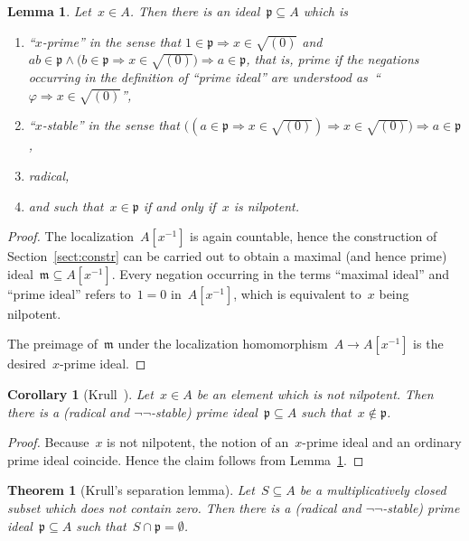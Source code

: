 \documentclass[com,11pt,crcready]{iosart2x}
\theoremstyle{definition}
\theoremstyle{plain}
\newtheorem{corollary}[definition]{Corollary}
\newtheorem{lemma}[definition]{Lemma}
\newtheorem{theorem}[definition]{Theorem}
\theoremstyle{remark}
\newcommand{\mmm}{\mathfrak{m}}
\newcommand{\ppp}{\mathfrak{p}}
\renewcommand{\_}{\mathpunct{.}\,}
\begin{document}
\begin{lemma}\label{lemma:x-prime}
Let~$x \in A$. Then there is an ideal~$\ppp \subseteq A$ which is
\begin{enumerate}
\item ``$x$-prime'' in the sense that
$1 \in \ppp \Rightarrow x \in \sqrt{(0)}$ and
$ab \in \ppp \wedge \bigl(b \in \ppp \Rightarrow x \in \sqrt{(0)}\bigr) \Longrightarrow
   a \in \ppp$,
that is, prime if the negations occurring in the definition of ``prime ideal''
are understood as~``$\varphi \Rightarrow x \in \sqrt{(0)}$'',
\item ``$x$-stable'' in the sense that
$\bigl((a \in \ppp \Rightarrow x \in \sqrt{(0)}) \Rightarrow x \in \sqrt{(0)}\bigr)
  \Rightarrow a \in \ppp$,
\item radical,
\item and such that~$x \in \ppp$ if and only if~$x$ is nilpotent.
\end{enumerate}
\end{lemma}

\begin{proof}The localization~$A[x^{-1}]$ is again countable, hence the
construction of Section~\ref{sect:constr} can be carried out to obtain a
maximal (and hence prime) ideal~$\mmm \subseteq A[x^{-1}]$. Every negation
occurring in the terms ``maximal ideal'' and ``prime ideal'' refers to~$1 = 0$
in~$A[x^{-1}]$, which is equivalent to~$x$ being nilpotent.

The preimage of~$\mmm$ under the localization homomorphism~$A \to A[x^{-1}]$ is
the desired~$x$-prime ideal.
\end{proof}

\begin{corollary}[Krull~\cite{krull:ohne}]\label{cor:nilp-prime}Let~$x \in A$ be an element which is not nilpotent. Then there is a
(radical and $\neg\neg$-stable) prime ideal~$\ppp \subseteq A$ such that~$x \not\in \ppp$.
\end{corollary}

\begin{proof}Because~$x$ is not nilpotent, the notion of an~$x$-prime ideal and
an ordinary prime ideal coincide. Hence the claim follows from
Lemma~\ref{lemma:x-prime}.\end{proof}

\begin{theorem}[Krull's separation lemma]Let~$S \subseteq A$ be a multiplicatively closed subset which
does not contain zero. Then there is a
(radical and $\neg\neg$-stable) prime ideal~$\ppp \subseteq A$ such that~$S
\cap \ppp = \emptyset$.
\end{theorem}
\end{document}
